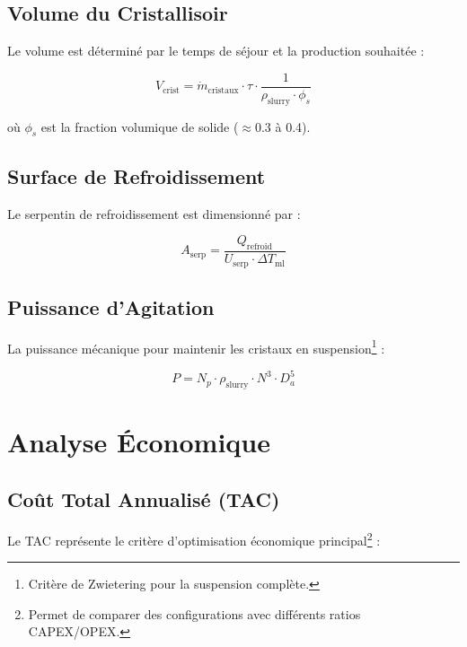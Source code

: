 \documentclass[12pt,a4paper,twoside]{article}
\begin{document}
\subsection{Volume du Cristallisoir}

Le volume est déterminé par le temps de séjour et la production souhaitée :

\begin{equation}
V_{\text{crist}} = \dot{m}_{\text{cristaux}} \cdot \tau \cdot \frac{1}{\rho_{\text{slurry}} \cdot \phi_s}
\end{equation}

où $\phi_s$ est la fraction volumique de solide ($\approx 0.3$ à 0.4).

\subsection{Surface de Refroidissement}

Le serpentin de refroidissement est dimensionné par :

\begin{equation}
\boxed{A_{\text{serp}} = \frac{Q_{\text{refroid}}}{U_{\text{serp}} \cdot \Delta T_{\text{ml}}}}
\end{equation}

\subsection{Puissance d'Agitation}

La puissance mécanique pour maintenir les cristaux en suspension\footnote{Critère de Zwietering pour la suspension complète.} :

\begin{equation}
P = N_p \cdot \rho_{\text{slurry}} \cdot N^3 \cdot D_a^5
\end{equation}

\section{Analyse Économique}

\subsection{Coût Total Annualisé (TAC)}

\lettrine[lines=2]{L}{}e TAC représente le critère d'optimisation économique principal\footnote{Permet de comparer des configurations avec différents ratios CAPEX/OPEX.} :
\end{document}
